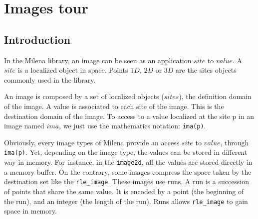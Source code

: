 






\section{Images tour}

\subsection{Introduction}


In the Milena library, an image can be seen as an application
$site$ to $value$.
A $site$ is a localized object in space.
Points $1D$, $2D$ or $3D$ are the sites objects commonly used in the
library.

An image is composed by a set of localized objects ($sites$), the definition domain of the image.
A value is associated to each site of the image. This is the destination domain
of the image.
To access to a value  localized at the site p in an image named $ima$, we
just use the mathematics notation: \verb+ima(p)+.

Obviously, every image types of Milena provide an access $site$ to $value$,
through \verb+ima(p)+. Yet, depending on the image type, the values can be
stored in different way in memory.
For instance, in the \verb+image2d+, all the values are stored directly in a
memory buffer.
On the contrary, some images compress the space taken by the destination set
like the \verb+rle_image+.
These images use runs.
A run is a succession of points that share the same value. It is encoded by
a point (the beginning of the run), and an integer (the length of the run).
Runs allows \verb+rle_image+ to gain space in memory.\\


